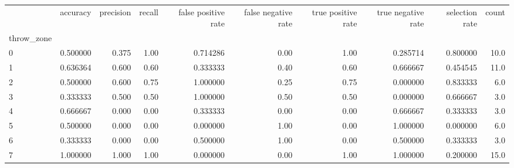 \begin{tabular}{lrrrrrrrrr}
\toprule
{} &  accuracy &  precision &  recall &  false positive rate &  false negative rate &  true positive rate &  true negative rate &  selection rate &  count \\
throw\_zone &           &            &         &                      &                      &                     &                     &                 &        \\
\midrule
0          &  0.500000 &      0.375 &    1.00 &             0.714286 &                 0.00 &                1.00 &            0.285714 &        0.800000 &   10.0 \\
1          &  0.636364 &      0.600 &    0.60 &             0.333333 &                 0.40 &                0.60 &            0.666667 &        0.454545 &   11.0 \\
2          &  0.500000 &      0.600 &    0.75 &             1.000000 &                 0.25 &                0.75 &            0.000000 &        0.833333 &    6.0 \\
3          &  0.333333 &      0.500 &    0.50 &             1.000000 &                 0.50 &                0.50 &            0.000000 &        0.666667 &    3.0 \\
4          &  0.666667 &      0.000 &    0.00 &             0.333333 &                 0.00 &                0.00 &            0.666667 &        0.333333 &    3.0 \\
5          &  0.500000 &      0.000 &    0.00 &             0.000000 &                 1.00 &                0.00 &            1.000000 &        0.000000 &    6.0 \\
6          &  0.333333 &      0.000 &    0.00 &             0.500000 &                 1.00 &                0.00 &            0.500000 &        0.333333 &    3.0 \\
7          &  1.000000 &      1.000 &    1.00 &             0.000000 &                 0.00 &                1.00 &            1.000000 &        0.200000 &   15.0 \\
\bottomrule
\end{tabular}
